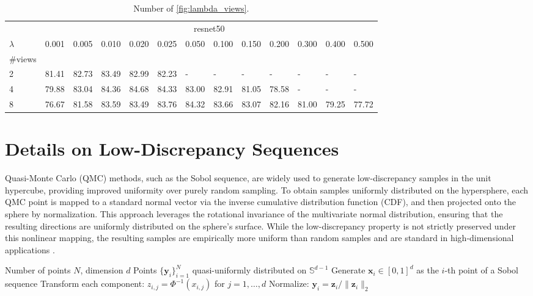 \begin{table}[t!]
\caption{Number of \cref{fig:lambda_views}.}
\label{tab:lambda_perf}
\begin{tabular}{lllllllllllll}
\toprule
 & \multicolumn{12}{c}{resnet50} \\
$\lambda$ & 0.001 & 0.005 & 0.010 & 0.020 & 0.025 & 0.050 & 0.100 & 0.150 & 0.200 & 0.300 & 0.400 & 0.500 \\
\#views &  &  &  &  &  &  &  &  &  &  &  &  \\
\midrule
2 & 81.41 & 82.73 & 83.49 & 82.99 & 82.23 & - & - & - & - & - & - & - \\
4 & 79.88 & 83.04 & 84.36 & 84.68 & 84.33 & 83.00 & 82.91 & 81.05 & 78.58 & - & - & - \\
8 & 76.67 & 81.58 & 83.59 & 83.49 & 83.76 & 84.32 & 83.66 & 83.07 & 82.16 & 81.00 & 79.25 & 77.72  \\
\bottomrule
\end{tabular}
\end{table}



\section{Details on Low-Discrepancy Sequences}
\label{sec:low_discrepancy}

Quasi-Monte Carlo (QMC) methods, such as the Sobol sequence, are widely used to generate low-discrepancy samples in the unit hypercube, providing improved uniformity over purely random sampling. To obtain samples uniformly distributed on the hypersphere, each QMC point is mapped to a standard normal vector via the inverse cumulative distribution function (CDF), and then projected onto the sphere by normalization. This approach leverages the rotational invariance of the multivariate normal distribution, ensuring that the resulting directions are uniformly distributed on the sphere's surface. While the low-discrepancy property is not strictly preserved under this nonlinear mapping, the resulting samples are empirically more uniform than random samples and are standard in high-dimensional applications \cite{marsaglia1972choosing,dick2010digital,caflisch1998monte}.
\begin{algorithmic}[1]
\Require Number of points $N$, dimension $d$
\Ensure Points $\{\mathbf{y}_i\}_{i=1}^N$ quasi-uniformly distributed on $\mathbb{S}^{d-1}$
    \State Generate $\mathbf{x}_i \in [0,1]^d$ as the $i$-th point of a Sobol sequence
    \State Transform each component: $z_{i,j} = \Phi^{-1}(x_{i,j})$ for $j = 1, \ldots, d$ 
    \State Normalize: $\mathbf{y}_i = \mathbf{z}_i / \|\mathbf{z}_i\|_2$
\EndFor
\end{algorithmic}









